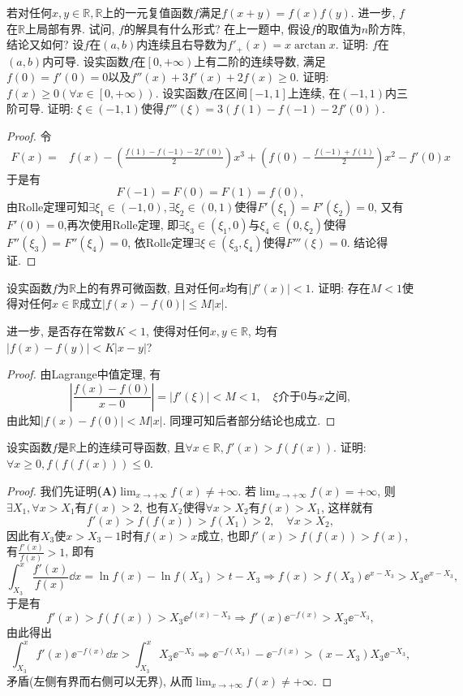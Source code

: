\begin{quizb}
\woe 若对任何\(x,y\in\mathbb{R},\mathbb{R}\)上的一元复值函数\(f\)满足\(f(x+y)=f(x)f(y)\). 进一步, \(f\)在\(\mathbb{R}\)上局部有界. 试问, \(f\)的解具有什么形式?
\woe 在上一题中, 假设\(f\)的取值为\(n\)阶方阵, 结论又如何?
\woe 设\(f\)在\((a,b)\)内连续且右导数为\(f'_+(x)=x\arctan x\). 证明: \(f\)在\((a,b)\)内可导.
\woe 设实函数\(f\)在\(\left[0,+\infty\right)\)上有二阶的连续导数, 满足\(f(0)=f'(0)=0\)以及\(f''(x)+3f'(x)+2f(x)\geqslant 0\). 证明: \(f(x)\geqslant 0\left(\forall x\in \left[0,+\infty\right)\right)\).
\woe 设实函数\(f\)在区间\([-1,1]\)上连续, 在\((-1,1)\)内三阶可导. 证明: \(\xi\in(-1,1)\)使得\(f'''(\xi)=3\left(f(1)-f(-1)-2f'(0)\right)\).
\begin{proof}
令\[\begin{split}
F(x)=&f(x)-\left(\frac{f(1)-f(-1)-2f'(0)}{2}\right)x^3+\left(f(0)-\frac{f(-1)+f(1)}{2}\right)x^2-f'(0)x
\end{split}\]于是有\[F(-1)=F(0)=F(1)=f(0),\]由Rolle定理可知\(\exists \xi_1\in(-1,0),\exists \xi_2\in(0,1)\)使得\(F'(\xi_1)=F'(\xi_2)=0\), 又有\(F'(0)=0\),再次使用Rolle定理, 即\(\exists \xi_3\in(\xi_1,0)\)与\(\xi_4\in(0,\xi_2)\)使得\(F''(\xi_3)=F''(\xi_4)=0\), 依Rolle定理\(\exists \xi\in(\xi_3,\xi_4)\)使得\(F'''(\xi)=0\). 结论得证.
\end{proof}
\woe 设实函数\(f\)为\(\mathbb{R}\)上的有界可微函数, 且对任何\(x\)均有\(|f'(x)|<1.\) 证明: 存在\(M<1\)使得对任何\(x\in\mathbb{R}\)成立\(|f(x)-f(0)|\leqslant M|x|\).

进一步, 是否存在常数\(K<1\), 使得对任何\(x,y\in\mathbb{R}\), 均有\(|f(x)-f(y)|<K|x-y|\)?
\begin{proof}
由Lagrange中值定理, 有\[\left|\frac{f(x)-f(0)}{x-0}\right|=|f'(\xi)|<M<1,\quad \xi\text{介于\(0\)与\(x\)之间},\]由此知\(|f(x)-f(0)|<M|x|\). 同理可知后者部分结论也成立.
\end{proof}
\woe 设实函数\(f\)是\(\mathbb{R}\)上的连续可导函数, 且\(\forall x\in\mathbb{R}, f'(x)>f\left(f(x)\right)\). 证明: \(\forall x\geqslant 0,f\left(f\left(f(x)\right)\right)\leqslant 0\).
\begin{proof}
我们先证明\textbf{(A)}\(\lim_{x\rightarrow+\infty}f(x)\ne +\infty\). 若\(\lim_{x\rightarrow+\infty}f(x)= +\infty\), 则\(\exists X_1,\forall x>X_1\)有\(f(x)>2\), 也有\(X_2\)使得\(\forall x>X_2\)有\(f(x)>X_1\), 这样就有\[f'(x)>f\left(f(x)\right)>f(X_1)>2,\quad \forall x>X_2,\]因此有\(X_3\)使\(x>X_3-1\)时有\(f(x)>x\)成立, 也即\(f'(x)>f\left(f(x)\right)>f(x)\), 有\(\frac{f'(x)}{f(x)}>1\), 即有\[\int_{X_3}^{x}\frac{f'(x)}{f(x)}\dd x=\ln f(x)-\ln f(X_3)>t-X_3\Rightarrow f(x)>f(X_3)\ee^{x-X_3}>X_3\ee^{x-X_3},\]于是有\[f'(x)>f\left(f(x)\right)>X_3\ee^{f(x)-X_3}\Rightarrow f'(x)\ee^{-f(x)}>X_3\ee^{-X_3},\]由此得出\[\int_{X_3}^{x}f'(x)\ee^{-f(x)}\dd x>\int_{X_3}^{x}X_3\ee^{-X_3}\Rightarrow \ee^{-f(X_3)}-\ee^{-f(x)}>(x-X_3)X_3\ee^{-X_3},\]矛盾(左侧有界而右侧可以无界), 从而\(\lim_{x\rightarrow+\infty}f(x)\ne +\infty\).


\end{proof}
\end{quizb}
